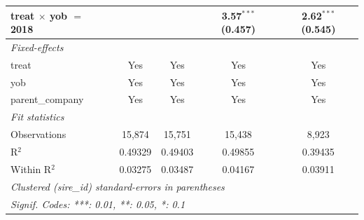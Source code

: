 \begin{table}[htbp]
\begin{tabular}{lcccc}
      treat $\times$ yob $=$ 2018  &                      &                      & 3.57$^{***}$ (0.457) & 2.62$^{***}$ (0.545)\\   
      \midrule
      \emph{Fixed-effects}\\
      treat                        & Yes                  & Yes                  & Yes                  & Yes\\  
      yob                          & Yes                  & Yes                  & Yes                  & Yes\\  
      parent\_company              & Yes                  & Yes                  & Yes                  & Yes\\  
      \midrule
      \emph{Fit statistics}\\
      Observations                 & 15,874               & 15,751               & 15,438               & 8,923\\  
      R$^2$                        & 0.49329              & 0.49403              & 0.49855              & 0.39435\\  
      Within R$^2$                 & 0.03275              & 0.03487              & 0.04167              & 0.03911\\  
      \midrule \midrule
      \multicolumn{5}{l}{\emph{Clustered (sire\_id) standard-errors in parentheses}}\\
      \multicolumn{5}{l}{\emph{Signif. Codes: ***: 0.01, **: 0.05, *: 0.1}}\\
   \end{tabular}
\end{table}


